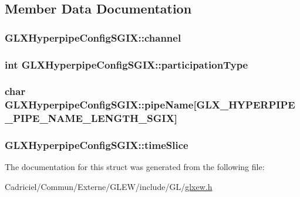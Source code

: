 \subsection{Member Data Documentation}
\hypertarget{struct_g_l_x_hyperpipe_config_s_g_i_x_abc812d8796ba89d5de4e33b3532d8335}{
\subsubsection[{channel}]{ G\-L\-X\-Hyperpipe\-Config\-S\-G\-I\-X\-::channel}}\label{struct_g_l_x_hyperpipe_config_s_g_i_x_abc812d8796ba89d5de4e33b3532d8335}
\hypertarget{struct_g_l_x_hyperpipe_config_s_g_i_x_a093cfaaec305531f66e1120929b5b01b}{
\subsubsection[{participation\-Type}]{ {\bf int} G\-L\-X\-Hyperpipe\-Config\-S\-G\-I\-X\-::participation\-Type}}\label{struct_g_l_x_hyperpipe_config_s_g_i_x_a093cfaaec305531f66e1120929b5b01b}
\hypertarget{struct_g_l_x_hyperpipe_config_s_g_i_x_a9e3748f92005cac81cb44d4c67acccb8}{
\subsubsection[{pipe\-Name}]{\setlength{\rightskip}{0pt plus 5cm}char G\-L\-X\-Hyperpipe\-Config\-S\-G\-I\-X\-::pipe\-Name\mbox{[}{\bf G\-L\-X\-\_\-\-H\-Y\-P\-E\-R\-P\-I\-P\-E\-\_\-\-P\-I\-P\-E\-\_\-\-N\-A\-M\-E\-\_\-\-L\-E\-N\-G\-T\-H\-\_\-\-S\-G\-I\-X}\mbox{]}}}\label{struct_g_l_x_hyperpipe_config_s_g_i_x_a9e3748f92005cac81cb44d4c67acccb8}
\hypertarget{struct_g_l_x_hyperpipe_config_s_g_i_x_afe9288e75dc1ae5e0f33eff978d7024d}{
\subsubsection[{time\-Slice}]{ G\-L\-X\-Hyperpipe\-Config\-S\-G\-I\-X\-::time\-Slice}}\label{struct_g_l_x_hyperpipe_config_s_g_i_x_afe9288e75dc1ae5e0f33eff978d7024d}


The documentation for this struct was generated from the following file\-:\begin{DoxyCompactItemize}
\item 
Cadriciel/\-Commun/\-Externe/\-G\-L\-E\-W/include/\-G\-L/\hyperlink{glxew_8h}{glxew.\-h}\end{DoxyCompactItemize}
